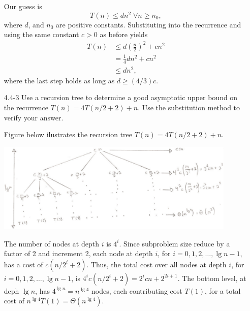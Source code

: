 \documentclass{report}
\makeatletter
\renewenvironment{framed}{%
 \def\FrameCommand##1{\hskip\@totalleftmargin
 \fboxsep=\FrameSep\fbox{##1}}%
 \MakeFramed {\advance\hsize-\width
   \@totalleftmargin\z@ \linewidth\hsize
   \@setminipage}}%
 {\par\unskip\endMakeFramed}
\DeclareMathOperator{\Forall}{\forall}
\makeatother
\begin{document}
\begin{enumerate}
\begin{framed}
Our guess is
\[
T(n) \le d n^2 \; \Forall n \ge n_0,
\]
where $d$, and $n_0$ are positive constants. Substituting into the
recurrence and using the same constant $c > 0$ as before yields
\begin{equation*}
\begin{aligned}
  T(n) &\le d \left(\frac{n}{2}\right)^2 + c n^2\\
       &= \frac{1}{4} dn^2 + cn^2\\
       &\le dn^2,
\end{aligned}
\end{equation*}
where the last step holds as long as $d \ge (4/3)c$.
\end{framed}

\newpage

\item[4.4{-}3]{Use a recursion tree to determine a good asymptotic upper bound
on the recurrence $T(n) = 4T(n/2 + 2) + n$. Use the substitution method to
verify your answer.}

\begin{framed}
Figure below ilustrates the recursion tree $T(n) = 4T(n/2 + 2) + n$.

\begin{center}
\includegraphics[width=0.9\textwidth]{images/4_4_3_1.pdf}
\end{center}

The number of nodes at depth $i$ is $4^i$. Since subproblem size reduce by
a factor of 2 and increment 2, each node at depth $i$, for
$i = 0, 1, 2, \dots, \lg n - 1$, has a cost of $c (n/2^i + 2)$. Thus, the total
cost over all nodes at depth $i$, for $i = 0, 1, 2, \dots, \lg n - 1$, is
$4^i c (n/2^i + 2) = 2^i cn + 2^{2i + 1}$. The bottom level, at deph $\lg n$,
has $4^{\lg n} = n^{\lg 4}$ nodes, each contributing cost $T(1)$, for a total
cost of $n^{\lg 4} T(1) = \Theta(n^{\lg 4})$.


\end{framed}
\end{enumerate}
\end{document}
